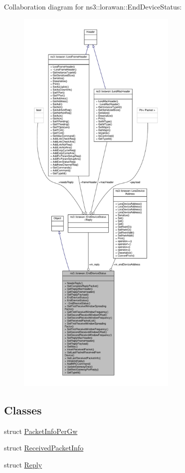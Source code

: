 Collaboration diagram for ns3\+:\+:lorawan\+:\+:End\+Device\+Status\+:
\nopagebreak
\begin{figure}[H]
\begin{center}
\leavevmode
\includegraphics[height=550pt]{classns3_1_1lorawan_1_1EndDeviceStatus__coll__graph}
\end{center}
\end{figure}
\subsection*{Classes}
\begin{DoxyCompactItemize}
\item 
struct \hyperlink{structns3_1_1lorawan_1_1EndDeviceStatus_1_1PacketInfoPerGw}{Packet\+Info\+Per\+Gw}
\item 
struct \hyperlink{structns3_1_1lorawan_1_1EndDeviceStatus_1_1ReceivedPacketInfo}{Received\+Packet\+Info}
\item 
struct \hyperlink{structns3_1_1lorawan_1_1EndDeviceStatus_1_1Reply}{Reply}
\end{DoxyCompactItemize}
